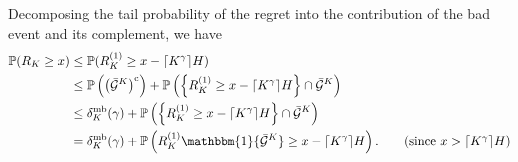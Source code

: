 \documentclass[11pt]{article}
\newcommand{\PP}{\mathbb{P}}
\begin{document}
Decomposing the tail probability of the regret into the contribution of the bad event and its complement, we have
\begin{align*}
    \PP(R_K\geq x) &\leq \PP(R_K^{(1)} \geq x-\lceil K^\gamma\rceil H)\\
    &\leq \PP\left(\left(\bar{\mathcal{G}}^K\right)^\mathrm{c}\right) + \PP\left( \left\{R_K^{(1)}\geq x-\lceil K^\gamma\rceil H\right\}\cap \bar{\mathcal{G}}^K\right)\\
    &\leq \delta_K^{\mathrm{mb}}(\gamma) + \PP\left( \left\{R_K^{(1)}\geq x-\lceil K^\gamma\rceil H\right\}\cap \bar{\mathcal{G}}^K\right)\\
    &= \delta_K^{\mathrm{mb}}(\gamma) + \PP\left( R_K^{(1)} \mathbbm{1}\{\bar{\mathcal{G}}^K\}\geq x-\lceil K^\gamma\rceil H \right). \tag{since $x > \lceil K^\gamma\rceil H$}
\end{align*}
\end{document}
